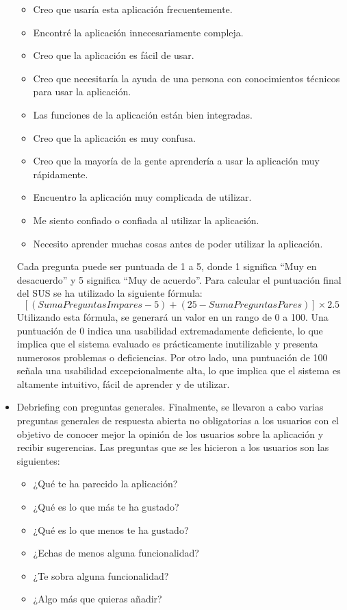 \begin{itemize}
          \begin{itemize}
              \item Creo que usaría esta aplicación frecuentemente.
              \item Encontré la aplicación innecesariamente compleja.
              \item Creo que la aplicación es fácil de usar.
              \item Creo que necesitaría la ayuda de una persona con conocimientos técnicos para usar la aplicación.
              \item Las funciones de la aplicación están bien integradas.
              \item Creo que la aplicación es muy confusa.
              \item Creo que la mayoría de la gente aprendería a usar la aplicación muy rápidamente.
              \item Encuentro la aplicación muy complicada de utilizar.
              \item Me siento confiado o confiada al utilizar la aplicación.
              \item Necesito aprender muchas cosas antes de poder utilizar la aplicación.
          \end{itemize}
          Cada pregunta puede ser puntuada de 1 a 5, donde 1 significa ``Muy en desacuerdo'' y 5 significa ``Muy de acuerdo''. Para calcular el puntuación final del SUS se ha utilizado la siguiente fórmula:
          \[[(SumaPreguntasImpares - 5) + (25 - SumaPreguntasPares)]\times2.5\]
          Utilizando esta fórmula, se generará un valor en un rango de 0 a 100. Una puntuación de 0 indica una usabilidad extremadamente deficiente, lo que implica que el sistema evaluado es prácticamente inutilizable y presenta numerosos problemas o deficiencias. Por otro lado, una puntuación de 100 señala una usabilidad excepcionalmente alta, lo que implica que el sistema es altamente intuitivo, fácil de aprender y de utilizar.
    \item Debriefing con preguntas generales. Finalmente, se llevaron a cabo varias preguntas generales de respuesta abierta no obligatorias a los usuarios con el objetivo de conocer mejor la opinión de los usuarios sobre la aplicación y recibir sugerencias. Las preguntas que se les hicieron a los usuarios son las siguientes:
          \begin{itemize}
              \item ¿Qué te ha parecido la aplicación?
              \item ¿Qué es lo que más te ha gustado?
              \item ¿Qué es lo que menos te ha gustado?
              \item ¿Echas de menos alguna funcionalidad?
              \item ¿Te sobra alguna funcionalidad?
              \item ¿Algo más que quieras añadir?
          \end{itemize}
\end{itemize}

